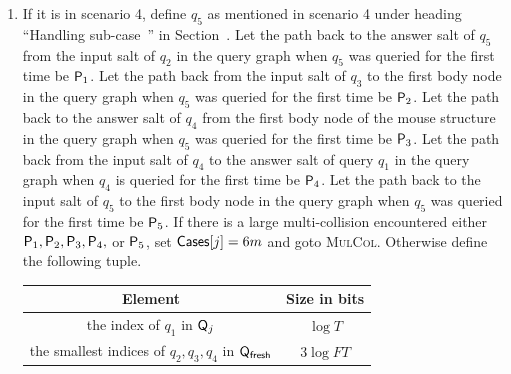 \begin{enumerate}
\begin{enumerate}
\begin{itemize}
\begin{itemize}
\begin{enumerate}
   \item If it is in scenario 4, define $q_5$ as mentioned in scenario 4 under heading ``Handling sub-case~'' in Section~. Let the path back to the answer salt of $q_5$ from the input salt of $q_2$ in the query graph when $q_5$ was queried for the first time be $\mathsf{P}_1$. 
   Let the path back from the input salt of $q_3$ to the first body node in the query graph when $q_5$ was queried for the first time be $\mathsf{P}_2$.
  Let the path back to the answer salt of $q_4$ from the first body node of the mouse structure in the query graph when $q_5$ was queried for the first time be $\mathsf{P}_3$. 
  Let the path back from the input salt of $q_4$ to the answer salt of query $q_1$ in the query graph when $q_4$ is queried for the first time be $\mathsf{P}_4$.
   Let the path back to the input salt of $q_5$ to the first body node in the query graph when $q_5$ was queried for the first time be $\mathsf{P}_5$.
   If there is a large multi-collision encountered either $\mathsf{P}_1,\mathsf{P}_2,\mathsf{P}_3,\mathsf{P}_4,$ or $\mathsf{P}_5$, set $\mathsf{Cases}[j]=6m$ and goto \textsc{MulCol}.
  Otherwise define the following tuple.
  \begin{center}
    \begin{tabular}{|c|c|}\hline

    Element & Size in bits \\ \hline\hline

    the index of $q_1$ in $\mathsf{Q}_j$ & $\log T$\\ \hline

    the smallest indices  of $q_2,q_3,q_4$ in $\mathsf{Q}_\textsf{fresh}$ & $3\log FT$   \\\hline
            

\end{tabular}
\end{center}
\end{enumerate}
\end{itemize}
\end{itemize}
\end{enumerate}
\end{enumerate}
